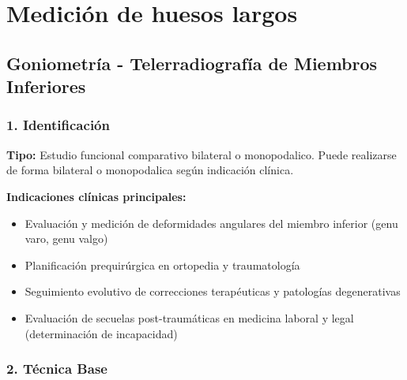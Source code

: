 	
	\twocolumn
	\clearpage
	
	
	
	\section{Medición de huesos largos}
	
	\subsection{Goniometría - Telerradiografía de Miembros Inferiores}
	
	\subsubsection*{1. Identificación}
	
	\textbf{Tipo:} Estudio funcional comparativo bilateral o monopodalico. Puede realizarse de forma bilateral o monopodalica según indicación clínica.
	
	\textbf{Indicaciones clínicas principales:}
	\begin{itemize}
		\item Evaluación y medición de deformidades angulares del miembro inferior (genu varo, genu valgo)
		\item Planificación prequirúrgica en ortopedia y traumatología
		\item Seguimiento evolutivo de correcciones terapéuticas y patologías degenerativas
		\item Evaluación de secuelas post-traumáticas en medicina laboral y legal (determinación de incapacidad)
	\end{itemize}
	
	\subsubsection*{2. Técnica Base}
	
